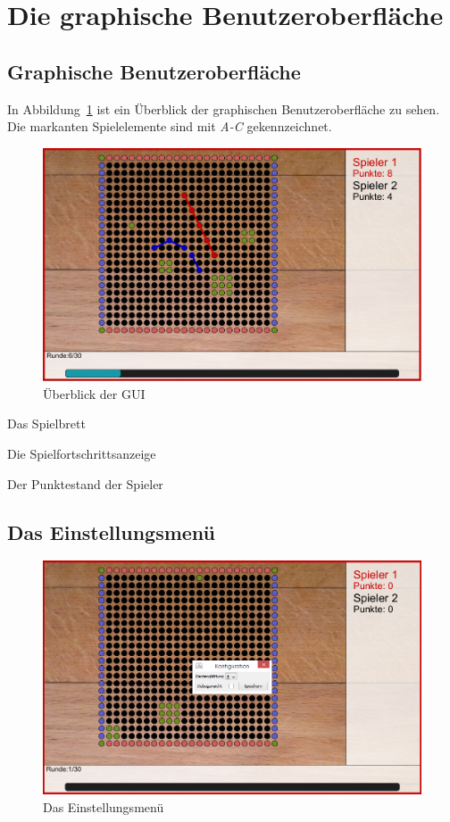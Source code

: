 \documentclass[a4paper, ngerman]{scrartcl}
\begin{document}
\section{Die graphische Benutzeroberfläche}

\subsection{Graphische Benutzeroberfläche}

	 
	In Abbildung~\ref{fig:GUI} ist ein Überblick der graphischen Benutzeroberfläche
	zu sehen. Die markanten Spielelemente sind mit \emph{A-C} gekennzeichnet.
	\begin{figure}[H]
		\centering		
		\includegraphics[scale = 0.6]{bilder/uebersicht.png} 
		\caption{Überblick der GUI}
		\label{fig:GUI}
	\end{figure}
	 
\begin{compactenum}[A)] 
\item Das Spielbrett
\item Die Spielfortschrittsanzeige 
\item Der Punktestand der Spieler
	\end{compactenum}
	
\subsection{Das Einstellungsmenü} 
	 \begin{figure}[H]
		\centering
		\includegraphics[scale=0.6]{bilder/konfiguration.png}
		\caption{Das Einstellungsmenü}
		\label{fig:Configuration}
	\end{figure}
	
\end{document}
